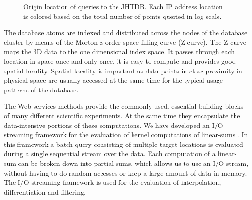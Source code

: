 \documentclass[10pt,twocolumn]{article}
\begin{document}
\begin{figure}
\caption{Origin location of queries to the JHTDB. Each IP address location is colored based on the total number of points queried in log scale.}
\label{fig:ip_map}
\end{figure}

The database atoms are indexed and distributed across the nodes of the database cluster by means of the Morton z-order space-filling curve (Z-curve). The 
Z-curve maps the 3D data to the one dimensional index space. It passes through each location in space once and only once, it is easy to compute and
provides good spatial locality. Spatial locality is important as data points in close proximity in physical space are usually accessed at the same time for the
typical usage patterns of the database.

The Web-services methods provide the commonly used, essential building-blocks of many different scientific experiments. At the same time they
encapsulate the data-intensive portions of these computations. We have developed an I/O streaming framework for the evaluation of kernel computations of
linear-sums \cite{KanovSC11}. In this framework a batch query consisting of multiple target locations is evaluated during a single sequential stream over 
the data. Each computation of a linear-sum can be broken down into partial-sums, which allows us to use an I/O stream, without having to do random 
accesses or keep a large amount of data in memory. The I/O streaming framework is used for the evaluation of interpolation, differentiation and filtering.
\end{document}
